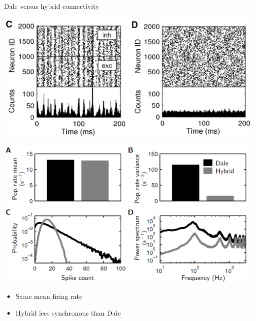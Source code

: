 \documentclass[fleqn]{beamer}
\newcommand{\ppc}[1]{\pause\setcounter{page}{#1}}
\begin{document}
\begin{frame}{Dale versus hybrid connectivity}
  \begin{minipage}{.48\linewidth}
   \begin{center}
\hspace*{-0.2cm}
    \includegraphics[width=\textwidth]{figures/kriener_dale1}
   \end{center}
  \end{minipage}\ppc{9}
\begin{minipage}{.48\linewidth}
 \begin{center}
\hspace*{0.25cm}
    \includegraphics[scale=0.11]{figures/kriener_dale2}
 \end{center}
     \begin{flushright}
      {\footnotesize \cite{Kriener2008}}
    \end{flushright}
\end{minipage}
\vspace*{1cm}
    \begin{itemize}
      \item Same mean firing rate
      \item Hybrid less synchronous than Dale
    \end{itemize}
\end{frame}
\end{document}
